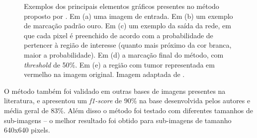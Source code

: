 \begin{figure}[h]
    
    \caption[Principais elementos gráficos presentes no método proposto por \cite{santos2022automated}.]{Exemplos dos principais elementos gráficos presentes no método proposto por \cite{santos2022automated}. Em (a) uma imagem de entrada. Em (b) um exemplo de marcação padrão ouro. Em (c) um exemplo da saída da rede, em que cada pixel é preenchido de acordo com a probabilidade de pertencer à região de interesse (quanto mais próximo da cor branca, maior a probabilidade). Em (d) a marcação final do método, com \textit{threshold} de 50\%. Em (e) a região com tumor representada em vermelho na imagem original. Imagem adaptada de \cite{santos2022automated}.}
    \label{fig:dali-results}
\end{figure}

O método também foi validado em outras bases de imagens presentes na literatura, e apresentou um \textit{f1-score} de 90\% na base desenvolvida pelos autores e média geral de 83\%. Além disso o método foi testado com diferentes tamanhos de sub-imagens -- o melhor resultado foi obtido para sub-imagens de tamanho 640x640 pixels.
